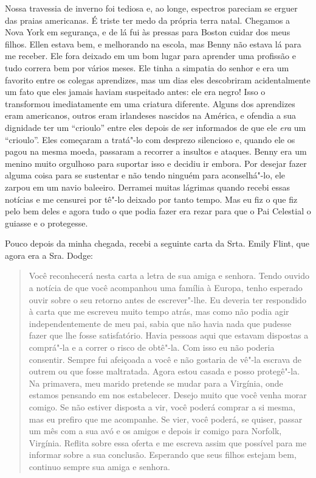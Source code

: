 Nossa travessia de inverno foi tediosa
e, ao longe, espectros pareciam se erguer das praias americanas. É
triste ter medo da própria terra natal. Chegamos a Nova York em
segurança, e de lá fui às pressas para Boston cuidar dos meus filhos.
Ellen estava bem, e melhorando na escola, mas Benny não estava lá para
me receber. Ele fora deixado em um bom lugar para aprender uma profissão
e tudo correra bem por vários meses. Ele tinha a simpatia do senhor e
era um favorito entre os colegas aprendizes, mas um dias eles
descobriram acidentalmente um fato que eles jamais haviam suspeitado
antes: ele era negro! Isso o transformou imediatamente em uma criatura
diferente. Alguns dos aprendizes eram americanos, outros eram irlandeses
nascidos na América, e ofendia a sua dignidade ter um ``crioulo'' entre
eles depois de ser informados de que ele \emph{era} um ``crioulo''. Eles
começaram a tratá"-lo com desprezo silencioso e, quando ele os pagou na
mesma moeda, passaram a recorrer a insultos e ataques. Benny era um
menino muito orgulhoso para suportar isso e decidiu ir embora. Por
desejar fazer alguma coisa para se sustentar e não tendo ninguém para
aconselhá"-lo, ele zarpou em um navio baleeiro. Derramei muitas lágrimas
quando recebi essas notícias e me censurei por tê"-lo deixado por tanto
tempo. Mas eu fiz o que fiz pelo bem deles e agora tudo o que podia
fazer era rezar para que o Pai Celestial o guiasse e o protegesse.

Pouco depois da minha chegada, recebi a
seguinte carta da Srta. Emily Flint, que agora era a Sra. Dodge:

\begin{quote}
Você reconhecerá nesta carta a letra de
sua amiga e senhora. Tendo ouvido a notícia de que você acompanhou uma
família à Europa, tenho esperado ouvir sobre o seu retorno antes de
escrever"-lhe. Eu deveria ter respondido à carta que me escreveu muito
tempo atrás, mas como não podia agir independentemente de meu pai, sabia
que não havia nada que pudesse fazer que lhe fosse satisfatório. Havia
pessoas aqui que estavam dispostas a comprá"-la e a correr o risco de
obtê"-la. Com isso eu não poderia consentir. Sempre fui afeiçoada a você
e não gostaria de vê"-la escrava de outrem ou que fosse maltratada. Agora
estou casada e posso protegê"-la. Na primavera, meu marido pretende se
mudar para a Virgínia, onde estamos pensando em nos estabelecer. Desejo
muito que você venha morar comigo. Se não estiver disposta a vir, você
poderá comprar a si mesma, mas eu prefiro que me acompanhe. Se vier,
você poderá, se quiser, passar um mês com a sua avó e os amigos e depois
ir comigo para Norfolk, Virgínia. Reflita sobre essa oferta e me escreva
assim que possível para me informar sobre a sua conclusão. Esperando que
seus filhos estejam bem, continuo sempre sua amiga e senhora.
\end{quote}

